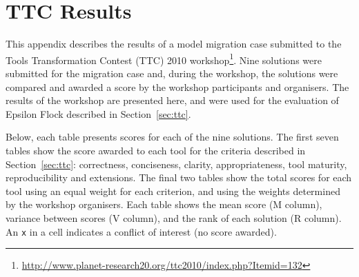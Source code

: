 \chapter{TTC Results}
\label{TTCScores}
This appendix describes the results of a model migration case submitted to the Tools Transformation Contest (TTC) 2010 workshop\footnote{\url{http://www.planet-research20.org/ttc2010/index.php?Itemid=132}}. Nine solutions were submitted for the migration case and, during the workshop, the solutions were compared and awarded a score by the workshop participants and organisers. The results of the workshop are presented here, and were used for the evaluation of Epsilon Flock described in Section~\ref{sec:ttc}. 

Below, each table presents scores for each of the nine solutions. The first seven tables show the score awarded to each tool for the criteria described in Section~\ref{sec:ttc}: correctness, conciseness, clarity, appropriateness, tool maturity, reproducibility and extensions. The final two tables show the total scores for each tool using an equal weight for each criterion, and using the weights determined by the workshop organisers. Each table shows the mean score (M column), variance between scores (V column), and the rank of each solution (R column). An \texttt{x} in a cell indicates a conflict of interest (no score awarded).

